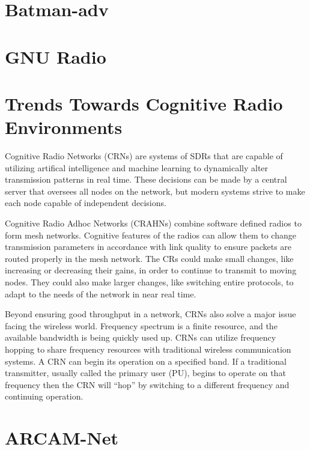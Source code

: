 \section{Batman-adv}

\section{GNU Radio}
 

\section{Trends Towards Cognitive Radio Environments}

Cognitive Radio Networks (CRNs) are systems of SDRs that are capable of utilizing artifical intelligence and machine learning to dynamically alter transmission patterns in real time. These decisions can be made by a central server that oversees all nodes on the network, but modern systems strive to make each node capable of independent decisions. 

Cognitive Radio Adhoc Networks (CRAHNs) combine software defined radios to form mesh networks. Cognitive features of the radios can allow them to change transmission parameters in accordance with link quality to ensure packets are routed properly in the mesh network. The CRs could make small changes, like increasing or decreasing their gains, in order to continue to transmit to moving nodes. They could also make larger changes, like switching entire protocols, to adapt to the needs of the network in near real time. 

Beyond ensuring good throughput in a network, CRNs also solve a major issue facing the wireless world. Frequency spectrum is a finite resource, and the available bandwidth is being quickly used up. CRNs can utilize frequency hopping to share frequency resources with traditional wireless communication systems. A CRN can begin its operation on a specified band. If a traditional transmitter, usually called the primary user (PU), begins to operate on that frequency then the CRN will ``hop'' by switching to a different frequency and continuing operation. 


\section{ARCAM-Net}

